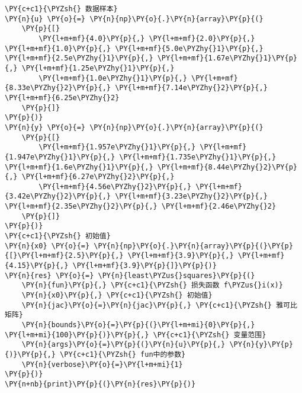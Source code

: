    \begin{tcolorbox}[breakable, size=fbox, boxrule=1pt, pad at break*=1mm,colback=cellbackground, colframe=cellborder]
\begin{Verbatim}[commandchars=\\\{\}]
\PY{c+c1}{\PYZsh{} 数据样本}
\PY{n}{u} \PY{o}{=} \PY{n}{np}\PY{o}{.}\PY{n}{array}\PY{p}{(}
    \PY{p}{[}
        \PY{l+m+mf}{4.0}\PY{p}{,} \PY{l+m+mf}{2.0}\PY{p}{,} \PY{l+m+mf}{1.0}\PY{p}{,} \PY{l+m+mf}{5.0e\PYZhy{}1}\PY{p}{,} \PY{l+m+mf}{2.5e\PYZhy{}1}\PY{p}{,} \PY{l+m+mf}{1.67e\PYZhy{}1}\PY{p}{,} \PY{l+m+mf}{1.25e\PYZhy{}1}\PY{p}{,} 
        \PY{l+m+mf}{1.0e\PYZhy{}1}\PY{p}{,} \PY{l+m+mf}{8.33e\PYZhy{}2}\PY{p}{,} \PY{l+m+mf}{7.14e\PYZhy{}2}\PY{p}{,} \PY{l+m+mf}{6.25e\PYZhy{}2}
    \PY{p}{]}
\PY{p}{)}
\PY{n}{y} \PY{o}{=} \PY{n}{np}\PY{o}{.}\PY{n}{array}\PY{p}{(}
    \PY{p}{[}
        \PY{l+m+mf}{1.957e\PYZhy{}1}\PY{p}{,} \PY{l+m+mf}{1.947e\PYZhy{}1}\PY{p}{,} \PY{l+m+mf}{1.735e\PYZhy{}1}\PY{p}{,} \PY{l+m+mf}{1.6e\PYZhy{}1}\PY{p}{,} \PY{l+m+mf}{8.44e\PYZhy{}2}\PY{p}{,} \PY{l+m+mf}{6.27e\PYZhy{}2}\PY{p}{,}
        \PY{l+m+mf}{4.56e\PYZhy{}2}\PY{p}{,} \PY{l+m+mf}{3.42e\PYZhy{}2}\PY{p}{,} \PY{l+m+mf}{3.23e\PYZhy{}2}\PY{p}{,} \PY{l+m+mf}{2.35e\PYZhy{}2}\PY{p}{,} \PY{l+m+mf}{2.46e\PYZhy{}2}
    \PY{p}{]}
\PY{p}{)}
\PY{c+c1}{\PYZsh{} 初始值}
\PY{n}{x0} \PY{o}{=} \PY{n}{np}\PY{o}{.}\PY{n}{array}\PY{p}{(}\PY{p}{[}\PY{l+m+mf}{2.5}\PY{p}{,} \PY{l+m+mf}{3.9}\PY{p}{,} \PY{l+m+mf}{4.15}\PY{p}{,} \PY{l+m+mf}{3.9}\PY{p}{]}\PY{p}{)}
\PY{n}{res} \PY{o}{=} \PY{n}{least\PYZus{}squares}\PY{p}{(}
    \PY{n}{fun}\PY{p}{,} \PY{c+c1}{\PYZsh{} 损失函数 f\PYZus{}i(x)}
    \PY{n}{x0}\PY{p}{,} \PY{c+c1}{\PYZsh{} 初始值}
    \PY{n}{jac}\PY{o}{=}\PY{n}{jac}\PY{p}{,} \PY{c+c1}{\PYZsh{} 雅可比矩阵}
    \PY{n}{bounds}\PY{o}{=}\PY{p}{(}\PY{l+m+mi}{0}\PY{p}{,} \PY{l+m+mi}{100}\PY{p}{)}\PY{p}{,} \PY{c+c1}{\PYZsh{} 变量范围}
    \PY{n}{args}\PY{o}{=}\PY{p}{(}\PY{n}{u}\PY{p}{,} \PY{n}{y}\PY{p}{)}\PY{p}{,} \PY{c+c1}{\PYZsh{} fun中的参数}
    \PY{n}{verbose}\PY{o}{=}\PY{l+m+mi}{1}
\PY{p}{)}
\PY{n+nb}{print}\PY{p}{(}\PY{n}{res}\PY{p}{)}
\end{Verbatim}
\end{tcolorbox}

